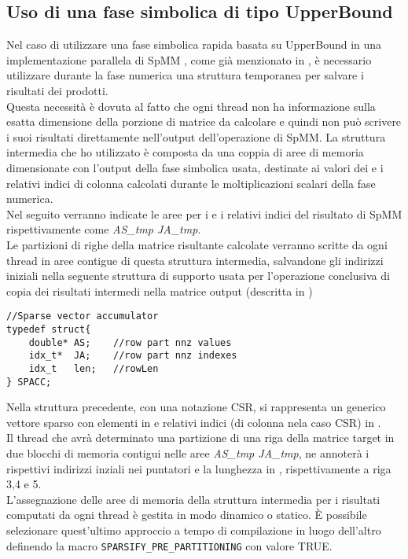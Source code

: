 \subsection{Uso di una fase simbolica di tipo UpperBound}
Nel caso di utilizzare una fase simbolica rapida basata su UpperBound in una implementazione parallela di SpMM
, come già menzionato in ,
è necessario utilizzare durante la fase numerica una struttura temporanea per salvare i risultati dei prodotti.\\
\label{chSpMMNum:UB_necessitaCopyBack}
Questa necessità è dovuta al fatto che ogni thread non ha informazione sulla esatta dimensione della porzione di
matrice da calcolare e quindi non può scrivere i suoi risultati direttamente nell'output dell'operazione di SpMM.
\voidLine
La struttura intermedia che ho utilizzato è composta da una coppia di aree di memoria
dimensionate con l'output della fase simbolica usata, destinate ai
valori dei \nnz e i relativi indici di colonna calcolati durante le moltiplicazioni scalari della fase numerica.\\
Nel seguito verranno indicate le aree per i \nnz e i relativi indici del risultato di SpMM rispettivamente come 
\emph{AS\_tmp JA\_tmp}.\\
\label{chSpMMNum:SPACC}	%
Le partizioni di righe della matrice risultante calcolate verranno scritte da ogni thread
in aree contigue di questa struttura intermedia, salvandone gli indirizzi iniziali 
nella seguente struttura di supporto
usata per l'operazione conclusiva di copia dei risultati intermedi nella matrice output
(descritta in )
\begin{lstlisting}
//Sparse vector accumulator
typedef struct{                                               
    double* AS;    //row part nnz values                                         
    idx_t*  JA;    //row part nnz indexes
    idx_t   len;   //rowLen
} SPACC;           
\end{lstlisting}
Nella struttura precedente, con una notazione CSR, si rappresenta un generico vettore sparso 
con  elementi \nnz in  e relativi indici (di colonna nela caso CSR) in .\\
Il thread che avrà determinato una partizione di una riga della matrice target
in due blocchi di memoria contigui nelle aree \emph{AS\_tmp JA\_tmp},
ne annoterà i rispettivi indirizzi inziali nei puntatori  e la lunghezza in ,
rispettivamente a riga 3,4 e 5.\\
L'assegnazione delle aree di memoria della struttura intermedia per i risultati computati 
da ogni thread è gestita in modo dinamico o statico.
È possibile selezionare quest'ultimo approccio a tempo di compilazione in luogo dell'altro
definendo la macro \verb|SPARSIFY_PRE_PARTITIONING| con valore {TRUE}.\\

